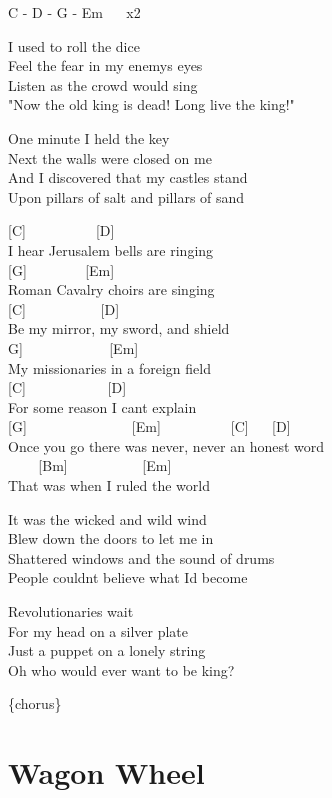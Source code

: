\documentclass[
  letterpaper,
  twoside=false]{scrbook}
\begin{document}
C - D - G - Em ~ ~x2

I used to roll the dice\\
Feel the fear in my enemy\textquotesingle s eyes\\
Listen as the crowd would sing\\
"Now the old king is dead! Long live the king!"

One minute I held the key\\
Next the walls were closed on me\\
And I discovered that my castles stand\\
Upon pillars of salt and pillars of sand

{[}C{]} ~ ~ ~ ~ ~ ~{[}D{]}\\
I hear Jerusalem bells are ringing\\
{[}G{]} ~ ~ ~ ~ ~{[}Em{]}\\
Roman Cavalry choirs are singing\\
{[}C{]} ~ ~ ~ ~ ~ ~ {[}D{]}\\
Be my mirror, my sword, and shield\\
\hspace*{0.333em}{[}G{]} ~ ~ ~ ~ ~ ~ ~ {[}Em{]}\\
My missionaries in a foreign field\\
{[}C{]} ~ ~ ~ ~ ~ ~ ~{[}D{]}\\
For some reason I can\textquotesingle t explain\\
{[}G{]} ~ ~ ~ ~ ~ ~ ~ ~ ~{[}Em{]} ~ ~ ~ ~ ~ ~{[}C{]} ~ ~{[}D{]}\\
Once you go there was never, never an honest word\\
\hspace*{0.333em} ~ ~ ~{[}Bm{]} ~ ~ ~ ~ ~ ~ {[}Em{]}\\
That was when I ruled the world

It was the wicked and wild wind\\
Blew down the doors to let me in\\
Shattered windows and the sound of drums\\
People couldn\textquotesingle t believe what I\textquotesingle d become

Revolutionaries wait\\
For my head on a silver plate\\
Just a puppet on a lonely string\\
Oh who would ever want to be king?

\{chorus\}

\hypertarget{wagon-wheel}{%
\chapter{Wagon Wheel}\label{wagon-wheel}}
\end{document}
